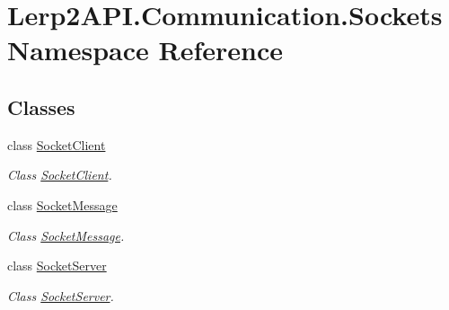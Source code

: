 \hypertarget{namespace_lerp2_a_p_i_1_1_communication_1_1_sockets}{}\section{Lerp2\+A\+P\+I.\+Communication.\+Sockets Namespace Reference}
\label{namespace_lerp2_a_p_i_1_1_communication_1_1_sockets}
\subsection*{Classes}
\begin{DoxyCompactItemize}
\item 
class \hyperlink{class_lerp2_a_p_i_1_1_communication_1_1_sockets_1_1_socket_client}{Socket\+Client}
\begin{DoxyCompactList}\small\item\em Class \hyperlink{class_lerp2_a_p_i_1_1_communication_1_1_sockets_1_1_socket_client}{Socket\+Client}. \end{DoxyCompactList}\item 
class \hyperlink{class_lerp2_a_p_i_1_1_communication_1_1_sockets_1_1_socket_message}{Socket\+Message}
\begin{DoxyCompactList}\small\item\em Class \hyperlink{class_lerp2_a_p_i_1_1_communication_1_1_sockets_1_1_socket_message}{Socket\+Message}. \end{DoxyCompactList}\item 
class \hyperlink{class_lerp2_a_p_i_1_1_communication_1_1_sockets_1_1_socket_server}{Socket\+Server}
\begin{DoxyCompactList}\small\item\em Class \hyperlink{class_lerp2_a_p_i_1_1_communication_1_1_sockets_1_1_socket_server}{Socket\+Server}. \end{DoxyCompactList}\end{DoxyCompactItemize}
